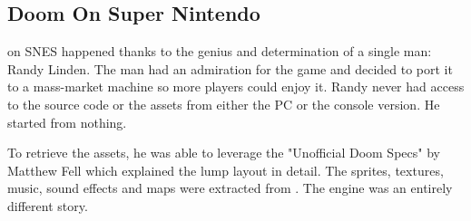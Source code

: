 \par
{}
















\subsection{Doom On Super Nintendo}

\doom{} on SNES happened thanks to the genius and determination of a single man: Randy Linden. The man had an admiration for the game and decided to port it to a mass-market machine so more players could enjoy it. Randy never had access to the source code or the assets from either the PC or the console version. He started from nothing.\\
\par
To retrieve the assets, he was able to leverage the "Unofficial Doom Specs" by Matthew Fell which explained the  lump layout in detail. The sprites, textures, music, sound effects and maps were extracted from . The engine was an entirely different story.\\
\par

